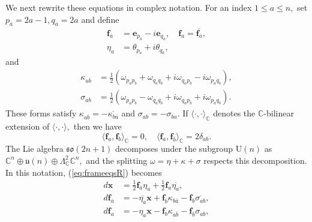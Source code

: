 \documentclass[11pt]{article}
\theoremstyle{definition}
\newcommand{\C}{\mathbb{C}}
\newcommand{\U}{\mathrm{U}}
\numberwithin{equation}{section}
\begin{document}
We next rewrite these equations in complex notation. For an index $1 \leq a \leq n,$ set $p_a = 2a-1, q_a = 2a$ and define
\begin{equation*}
	\begin{aligned}
		\mathbf{f}_{\overline a} & = \mathbf{e}_{p_a} - i \mathbf{e}_{q_a}, \quad \mathbf{f}_a = \overline{\mathbf{f}_{\overline{a}}}, \\
		\eta_a                   & = \theta_{p_a} + i \theta_{q_a},                                                                    
	\end{aligned}
\end{equation*}
and
\begin{equation*}
	\begin{aligned}
		\kappa_{a \overline{b}} & = \tfrac{1}{2} ( \omega_{p_a p_b} + \omega_{q_a q_b} + i \omega_{q_a p_b} - i \omega_{p_a q_b}), \\
		\sigma_{ab}             & = \tfrac{1}{2} ( \omega_{p_a p_b} - \omega_{q_a q_b} + i \omega_{q_a p_b} + i \omega_{p_a q_b}). 
	\end{aligned}		
\end{equation*}
These forms satisfy $\kappa_{a \overline{b}} = - \overline{\kappa_{b \overline{a}}}$ and $\sigma_{ab} = -\sigma_{ba}.$ If $\langle \cdot, \cdot \rangle_\C$ denotes the $\C$-bilinear extension of $\langle \cdot, \cdot \rangle,$ then we have
\begin{equation*}
	\langle \mathbf{f}_a, \mathbf{f}_b \rangle_\C = 0, \quad \langle \mathbf{f}_a, \mathbf{f}_{\overline{b}} \rangle_\C = 2 \delta_{ab}.
\end{equation*}
The Lie algebra $\mathfrak{so}(2n+1)$ decomposes under the subgroup $\U(n)$ as $\C^n \oplus \mathfrak{u}(n) \oplus \Lambda^2_\C \C^n,$ and the splitting $\omega = \eta + \kappa + \sigma$ respects this decomposition. In this notation, (\ref{eq:frameeqsR}) becomes
\begin{equation}\label{eq:frameeqsC}
	\begin{aligned}
		d \mathbf{x}                & = \tfrac{1}{2} \mathbf{f}_{\overline{a}} \eta_a + \tfrac{1}{2} \mathbf{f}_a \overline{\eta_a},                              \\
		d \mathbf{f}_{\overline{a}} & = - \overline{\eta_a} \mathbf{x} + \mathbf{f}_{\overline{b}} \kappa_{b \overline{a}} - \mathbf{f}_b \overline{\sigma_{ab}}, \\
		d \mathbf{f}_a              & = - \eta_a \mathbf{x} - \mathbf{f}_b \kappa_{a \overline{b}} - \mathbf{f}_{\overline{b}} \sigma_{ab},                       
	\end{aligned}
\end{equation}
\end{document}

